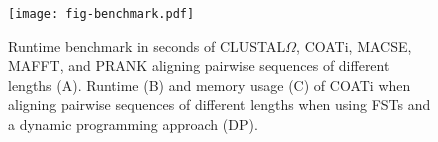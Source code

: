 


\begin{figure}[h!]
\centering
    \texttt{[image: fig-benchmark.pdf]}
    \caption{Runtime benchmark in seconds of CLUSTAL$\Omega$, COATi, MACSE,
    MAFFT, and PRANK aligning pairwise sequences of different lengths (A).
    Runtime (B) and memory usage (C) of COATi when aligning pairwise sequences
    of different lengths when using FSTs and a dynamic programming approach
    (DP).}
    \label{fig:benchmark}
\end{figure}
